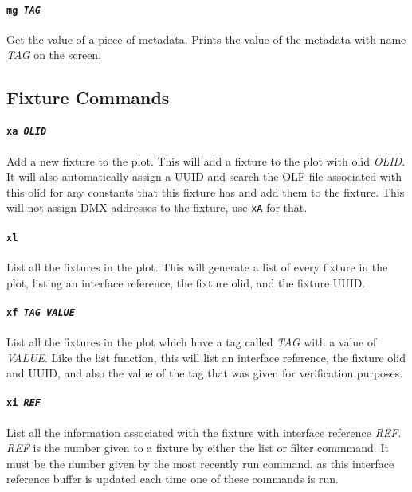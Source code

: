 \documentclass[a4paper]{article}
\begin{document}
\paragraph{\texttt{mg \textit{TAG}}}
Get the value of a piece of metadata. Prints the value of the metadata with
name \textit{TAG} on the screen.

\subsection{Fixture Commands}

\paragraph{\texttt{xa \textit{OLID}}}
Add a new fixture to the plot. This will add a fixture to the plot with olid 
\textit{OLID}. It will also automatically assign a UUID and search the OLF 
file associated with this olid for any constants that this fixture has and 
add them to the fixture. This will not assign DMX addresses to the fixture,
use \texttt{xA} for that.

\paragraph{\texttt{xl}}
List all the fixtures in the plot. This will generate a list of every fixture 
in the plot, listing an interface reference, the fixture olid, and the fixture 
UUID.

\paragraph{\texttt{xf \textit{TAG VALUE}}}
List all the fixtures in the plot which have a tag called \textit{TAG} with a 
value of \textit{VALUE}. Like the list function, this will list an interface 
reference, the fixture olid and UUID, and also the value of the tag that was 
given for verification purposes.

\paragraph{\texttt{xi \textit{REF}}}
List all the information associated with the fixture with interface reference 
\textit{REF}. \textit{REF} is the number given to a fixture by either the 
list or filter commmand. It must be the number given by the most recently run 
command, as this interface reference buffer is updated each time one of these 
commands is run.
\end{document}
